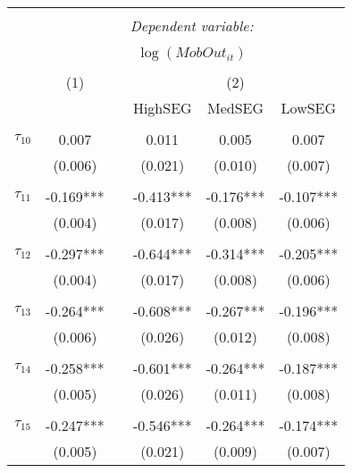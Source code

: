 \begin{tabular}{@{\extracolsep{-5pt}}lccccc} 
\\[-1.8ex]\hline 
\hline \\[-1.8ex] 
 & \multicolumn{5}{c}{\textit{Dependent variable:}} \\ 
\cline{2-6} 
\\[-1.8ex] & \multicolumn{5}{c}{$\log(MobOut_{it})$}\\ 
\\[-1.8ex] & (1) && \multicolumn{3}{c}{(2)} \\ 
\cline{2-2}\cline{4-6}
        &&& HighSEG & MedSEG & LowSEG  \\
 \\[-1.8ex] 
$\tau_{10}$     &   0.007   &&   0.011   &   0.005   &   0.007   \\
                &  (0.006)  &&  (0.021)  &  (0.010)  &  (0.007)  \\
                &           &&           &           &           \\[-2.1ex]
$\tau_{11}$     & -0.169*** && -0.413*** & -0.176*** & -0.107*** \\
                &  (0.004)  &&  (0.017)  &  (0.008)  &  (0.006)  \\
                &           &&           &           &           \\[-2.1ex]
$\tau_{12}$     & -0.297*** && -0.644*** & -0.314*** & -0.205*** \\
                &  (0.004)  &&  (0.017)  &  (0.008)  &  (0.006)  \\
                &           &&           &           &           \\[-2.1ex]
$\tau_{13}$     & -0.264*** && -0.608*** & -0.267*** & -0.196*** \\
                &  (0.006)  &&  (0.026)  &  (0.012)  &  (0.008)  \\
                &           &&           &           &           \\[-2.1ex]
$\tau_{14}$     & -0.258*** && -0.601*** & -0.264*** & -0.187*** \\
                &  (0.005)  &&  (0.026)  &  (0.011)  &  (0.008)  \\
                &           &&           &           &           \\[-2.1ex]
$\tau_{15}$     & -0.247*** && -0.546*** & -0.264*** & -0.174*** \\
                &  (0.005)  &&  (0.021)  &  (0.009)  &  (0.007)  \\

\end{tabular}
